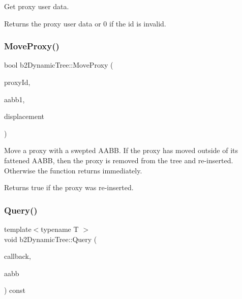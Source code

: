 Get proxy user data. \begin{DoxyReturn}{Returns}
the proxy user data or 0 if the id is invalid. 
\end{DoxyReturn}
\mbox{\label{classb2DynamicTree_a7748252811f3c575015931399cbe4daa}} 
\subsubsection{\texorpdfstring{Move\+Proxy()}{MoveProxy()}}
{\footnotesize\ttfamily bool b2\+Dynamic\+Tree\+::\+Move\+Proxy (\begin{DoxyParamCaption}\item[{int32}]{proxy\+Id,  }\item[{const \mbox{\hyperlink{structb2AABB}{b2\+A\+A\+BB}} \&}]{aabb1,  }\item[{const \mbox{\hyperlink{structb2Vec2}{b2\+Vec2}} \&}]{displacement }\end{DoxyParamCaption})}

Move a proxy with a swepted A\+A\+BB. If the proxy has moved outside of its fattened A\+A\+BB, then the proxy is removed from the tree and re-\/inserted. Otherwise the function returns immediately. \begin{DoxyReturn}{Returns}
true if the proxy was re-\/inserted. 
\end{DoxyReturn}
\mbox{\label{classb2DynamicTree_a324df3eb65dfc22d3dcdca387737b193}} 
\subsubsection{\texorpdfstring{Query()}{Query()}}
{\footnotesize\ttfamily template$<$typename T $>$ \\
void b2\+Dynamic\+Tree\+::\+Query (\begin{DoxyParamCaption}\item[{T $\ast$}]{callback,  }\item[{const \mbox{\hyperlink{structb2AABB}{b2\+A\+A\+BB}} \&}]{aabb }\end{DoxyParamCaption}) const\hspace{0.3cm}{\ttfamily [inline]}}

